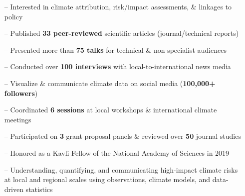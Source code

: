 \documentclass[10pt,letterpaper]{altacv} %
\begin{document}
\tagline{}

%

\begin{fullwidth}
\makecvheader
\end{fullwidth}

%

\vspace{-0.09in}
\begin{itemize}
    \setlength{\itemindent}{0.5em}
    \item[--] \small{Interested in climate attribution, risk\slash impact assessments, \& linkages to policy}
    \item[--] \small{Published \textbf{33 peer-reviewed} scientific articles (journal/technical reports)}
    \item[--] \small{Presented more than \textbf{75 talks} for technical \& non-specialist audiences}
    \item[--] \small{Conducted over \textbf{100 interviews} with local-to-international news media}
    \item[--] \small{Visualize \& communicate climate data on social media (\textbf{100,000+ followers})}
    \item[--] \small{Coordinated \textbf{6 sessions} at local workshops \& international climate meetings}
    \item[--] \small{Participated on \textbf{3} grant proposal panels \& reviewed over \textbf{50} journal studies}    
    \item[--] \small{Honored as a Kavli Fellow of the National Academy of Sciences in 2019}
\end{itemize}
\smallskip

\vspace*{-0.2cm}

\begin{itemize}
\item[--] \small{Understanding, quantifying, and communicating high-impact climate risks at local and regional scales using observations, climate models, and data-driven statistics}
\end{itemize}
\medskip
\end{document}
